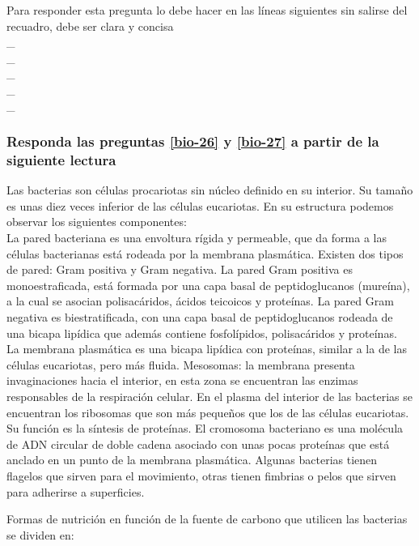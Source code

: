 \begin{enumerate}
Para responder esta pregunta lo debe hacer en las líneas siguientes sin salirse del recuadro, debe ser clara y concisa  \hrulefill\\
\_\hrulefill\\
\_\hrulefill\\
\_\hrulefill\hrulefill\\
\_\hrulefill\\
\_\hrulefill\\


\subsubsection*{Responda las preguntas \ref{bio-26} y \ref{bio-27} a partir de la  siguiente lectura}


\noindent Las bacterias son células procariotas sin núcleo definido en su interior. Su tamaño es unas diez veces inferior  de las células eucariotas. En su estructura podemos observar los siguientes componentes:\\

La pared bacteriana es una envoltura rígida y permeable, que da forma a las células bacterianas está rodeada por la membrana plasmática. Existen dos tipos de pared: Gram positiva y Gram negativa. La pared Gram positiva es monoestraficada, está formada por una capa basal de peptidoglucanos (mureína), a la cual se asocian polisacáridos, ácidos teicoicos y proteínas. La pared Gram negativa es biestratificada, con una capa basal de peptidoglucanos rodeada de una bicapa lipídica que además contiene fosfolípidos, polisacáridos y proteínas.\\

La membrana plasmática es una bicapa lipídica con proteínas, similar a la de las células eucariotas, pero más fluida. Mesosomas: la membrana presenta invaginaciones hacia el interior, en esta zona se encuentran las enzimas responsables de la respiración celular.  En el plasma del interior de las bacterias se encuentran los ribosomas que son más pequeños que los de las células eucariotas. Su función es la síntesis de proteínas. El cromosoma bacteriano es una molécula de ADN circular de doble cadena asociado con unas pocas proteínas que está anclado en un punto de la membrana plasmática.  Algunas bacterias tienen flagelos que sirven para el movimiento, otras tienen fimbrias o pelos  que sirven para adherirse a superficies.

Formas de nutrición en función de la fuente de carbono que utilicen las bacterias se dividen en:\\


\end{enumerate}
